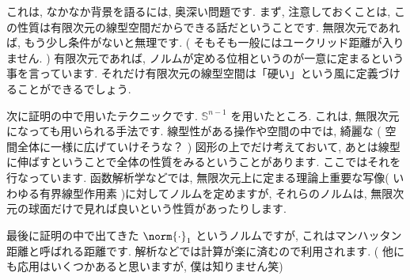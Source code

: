 \begin{column}
    これは, なかなか背景を語るには, 奥深い問題です. まず, 注意しておくことは, この性質は有限次元の線型空間だからできる話だということです. 無限次元であれば, もう少し条件がないと無理です. ( そもそも一般にはユークリッド距離が入りません. ) 有限次元であれば, ノルムが定める位相というのが一意に定まるという事を言っています. それだけ有限次元の線型空間は「硬い」という風に定義づけることができるでしょう.

    次に証明の中で用いたテクニックです.  $\mathbb{S}^{n-1}$ を用いたところ. これは, 無限次元になっても用いられる手法です. 線型性がある操作や空間の中では, 綺麗な ( 空間全体に一様に広げていけそうな？ ) 図形の上でだけ考えておいて, あとは線型に伸ばすということで全体の性質をみるということがあります. ここではそれを行なっています. 函数解析学などでは, 無限次元上に定まる理論上重要な写像( いわゆる有界線型作用素 )に対してノルムを定めますが, それらのノルムは, 無限次元の球面だけで見れば良いという性質があったりします.

    最後に証明の中で出てきた $\norm{ \cdot } _ 1$ というノルムですが, これはマンハッタン距離と呼ばれる距離です. 解析などでは計算が楽に済むので利用されます. ( 他にも応用はいくつかあると思いますが, 僕は知りません笑)
\end{column}
\newpage

